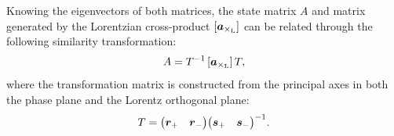 Knowing the eigenvectors of both matrices, the state matrix \(A\) and matrix generated by the Lorentzian cross-product \([\vec{a}_{\lorcrossp{}{}}]\) can be related through the following similarity transformation:
\begin{equation}
     A = T^{-1}\,[\vec{a}_{\lorcrossp{}{}}]\,T,
\end{equation}
where the transformation matrix is constructed from the principal axes in both the phase plane and the Lorentz orthogonal plane:
\begin{equation}
     T = \mqty(\vec{r}_+ & \vec{r}_-) \mqty(\vec{s}_+ & \vec{s}_-)^{-1}.
\end{equation}


